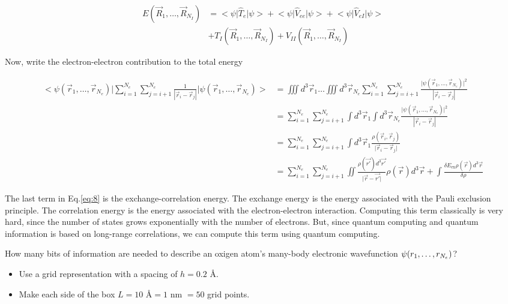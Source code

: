 \documentclass[10pt]{article}
\numberwithin{equation}{section}
\theoremstyle{defi}
\begin{document}
\begin{align}
  \label{eq:7}
  E(\vec{R}_1, \dots, \vec{R}_{N_I}) &= \big<\psi\big|\hat{T}_e\big|\psi\big> + \big<\psi\big|\hat{V}_{ee}\big|\psi\big> + \big<\psi\big|\hat{V}_{eI}\big|\psi\big>\nonumber\\
  &+ T_I(\vec{R}_1, \dots, \vec{R}_{N_I}) + V_{II}(\vec{R}_1, \dots, \vec{R}_{N_I})
\end{align}

Now, write the electron-electron contribution to the total energy 

\begin{align}
  \label{eq:8}
  \big<\psi(\vec{r}_1, \dots, \vec{r}_{N_e})\big|\sum_{i=1}^{N_e}\sum_{j=i+1}^{N_e}\frac{1}{|\vec{r}_i - \vec{r}_j|}\big|\psi(\vec{r}_1, \dots, \vec{r}_{N_e})\big> &= \iiint d^3 \vec{r}_{1}\dots\iiint d^3\vec{r}_{N_e}
  \sum_{i=1}^{N_e}\sum_{j=i+1}^{N_e}\frac{\big|\psi(\vec{r}_1, \dots, \vec{r}_{N_e})\big|^2}{|\vec{r}_i - \vec{r}_j|}\nonumber\\
  &= \sum_{i=1}^{N_e}\sum_{j=i+1}^{N_e}\int d^3\vec{r}_{1}\int d^3\vec{r}_{N_e}\frac{\big|\psi(\vec{r}_1, \dots, \vec{r}_{N_e})\big|^2}{|\vec{r}_i - \vec{r}_j|}\nonumber\\
  &= \sum_{i=1}^{N_e}\sum_{j=i+1}^{N_e}\int d^3\vec{r}_{1} \frac{\rho(\vec{r}_i, \vec{r}_{j})}{\big|\vec{r}_i - \vec{r}_j\big|}\nonumber\\
  &= \sum_{i=1}^{N_e}\sum_{j=i+1}^{N_e}\iint \frac{\rho(\vec{r'}) d^3\vec{r'}}{\big|\vec{r} - \vec{r'}\big|} \rho(\vec{r}) d^3\vec{r} + \int \frac{\delta E_{\text{ex}} \rho(\vec{r}) d^3\vec{r}}{\delta \rho}
\end{align}

The last term in Eq.\eqref{eq:8} is the exchange-correlation energy. The exchange energy is the energy associated with the Pauli exclusion principle. The correlation energy is the energy associated with the electron-electron interaction. 
Computing this term classically is very hard, since the number of states grows exponentially with the number of electrons. 
But, since quantum computing and quantum information is based on long-range correlations, we can compute this term using quantum computing.

\begin{question}
  How many bits of information are needed to describe an oxigen atom's many-body electronic wavefunction $\mathlarger{\psi}(r_1, \dots, r_{N_e})$?
\end{question}
\begin{itemize}
  \item Use a grid representation with a spacing of $h = 0.2$ \AA.
  \item Make each side of the box $L = 10$ \AA $= 1$ nm $= 50$ grid points. 
\end{itemize}
\end{document}
